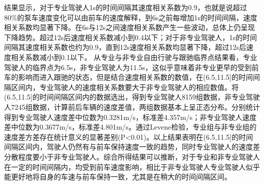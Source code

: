 结果显示，对于专业驾驶人1s的时间间隔其速度相关系数为0.9，也就是说超过80\%的泵车速度变化可以由前车的速度解释，到6s之前每增加1s的时间间隔，速度相关系数均显著下降。在6s与12s之间速度相关系数产生一些波动，总体上仍呈现下降趋势。超过12s后速度相关系数减小到0.4以下；对于非专业驾驶人，1s的时间间隔其速度相关系数也约为0.9，直到12s速度相关系数均显著下降，超过12s后速度相关系数减小到0.1以下。
从专业与非专业自由行驶与跟驰临界点结果看，专业驾驶人的临界点为6.5s，非专业驾驶人为11.5s，这似乎意味着非专业更早的受到前车的影响而进入跟驰的状态，但是结合速度相关系数的数值，在(6.5,11.5]的时间间隔区间内，专业驾驶人的速度相关系数要大于非专业驾驶人的相应数值。将(6.5,11.5]的时间间隔区间内的数据选出，得到专业驾驶人8159组数据，非专业驾驶人7245组数据，计算前后车辆的速度差值，两组数据基本上呈正态分布。分别统计得到专业驾驶人速度差中位数为0.3281m/s，标准差4.357m/s；非专业驾驶人速度差中位数为0.3677m/s，标准差4.801m/s。通过Levene检验，专业组与非专业组的速度差方差存在统计意义的显著差别(P<0.01)。以上结果表明在(6.5,11.5]的时间间隔区间内，驾驶人仍然有与前车保持速度一致的趋势，同时专业驾驶人的速度差分散程度要小于非专业驾驶人。综合所得结果可以推断，对于专业和非专业驾驶人在一定的时间间隔内，均受到前车速度影响，相比于非专业驾驶人专业驾驶人似乎能更好地将自身的车速与前车保持一致，尤其是在稍大的时间间隔区间。
